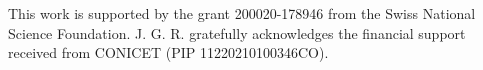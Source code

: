 \documentclass[draft]{agujournal2019}
\begin{document}

%
%
%
%

%
%

%

%





\acknowledgments
This work is supported by the grant 200020-178946 from the Swiss National Science Foundation. J. G. R. gratefully acknowledges the financial support received from CONICET (PIP 11220210100346CO).
\end{document}
